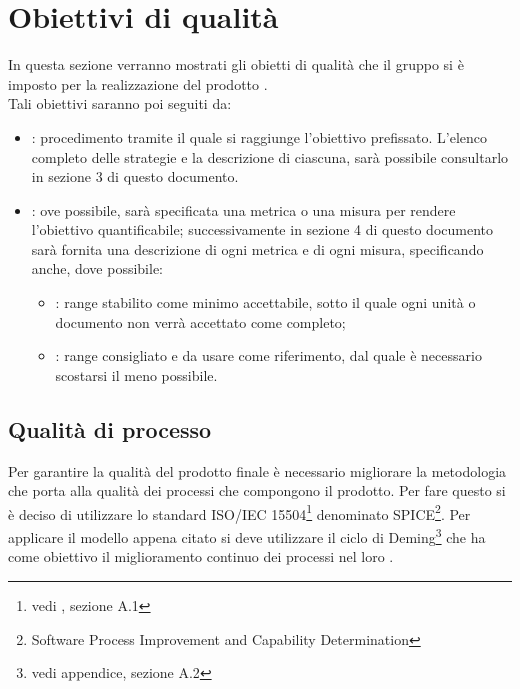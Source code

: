 \newpage
\section{Obiettivi di qualità}%
\label{2.1}
In questa sezione verranno mostrati gli obietti di qualità che il gruppo si è imposto per la realizzazione del prodotto \Progetto{}. \\
Tali obiettivi saranno poi seguiti da:
\begin{itemize}
\item {}: procedimento tramite il quale si raggiunge l'obiettivo prefissato. L'elenco completo delle strategie e la descrizione di ciascuna, sarà possibile consultarlo in sezione 3 di questo documento.
\item {}: ove possibile, sarà specificata una metrica o una misura per rendere l'obiettivo quantificabile; successivamente in sezione 4 di questo documento sarà fornita una descrizione di ogni metrica e di ogni misura, specificando anche, dove possibile:
\begin{itemize}
\item {}: range stabilito come minimo accettabile, sotto il quale ogni unità o documento non verrà accettato come completo;
\item {}: range consigliato e da usare come riferimento, dal quale è necessario scostarsi il meno possibile.
\end{itemize}
\end{itemize}
\subsection{Qualità di processo} %
\label{2.1.1}
Per garantire la qualità del prodotto finale è necessario migliorare la metodologia che porta alla qualità dei processi che compongono il prodotto. Per fare questo si è deciso di utilizzare lo standard ISO/IEC 15504\footnote{vedi , sezione A.1} denominato SPICE\footnote{Software Process Improvement and Capability Determination}.
Per applicare il modello appena citato si deve utilizzare il ciclo di Deming\footnote{vedi appendice, sezione A.2} che ha come obiettivo il miglioramento continuo dei processi nel loro .
